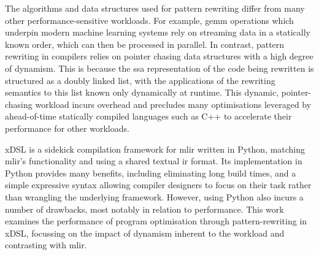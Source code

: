 The algorithms and data structures used for pattern rewriting differ from many other performance-sensitive workloads.
For example, \ac{gemm} operations which underpin modern machine learning systems rely on streaming data in a statically known order, which can then be processed in parallel.
In contrast, pattern rewriting in compilers relies on pointer chasing data structures with a high degree of dynamism.
This is because the \ac{ssa} representation of the code being rewritten is structured as a doubly linked list, with the applications of the rewriting semantics to this list known only dynamically at runtime.
This dynamic, pointer-chasing workload incurs overhead and precludes many optimisations leveraged by ahead-of-time statically compiled languages such as C++ to accelerate their performance for other workloads.

xDSL is a sidekick compilation framework for \ac{mlir} written in Python, matching \ac{mlir}'s functionality and using a shared textual \ac{ir} format.
Its implementation in Python provides many benefits, including eliminating long build times, and a simple expressive syntax allowing compiler designers to focus on their task rather than wrangling the underlying framework.
However, using Python also incurs a number of drawbacks, most notably in relation to performance.
This work examines the performance of program optimisation through pattern-rewriting in xDSL, focussing on the impact of dynamism inherent to the workload and contrasting with \ac{mlir}.


